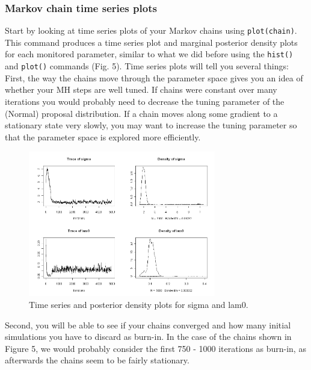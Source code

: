 \subsubsection{Markov chain time series plots}
Start by looking at time series plots of your Markov chains using \verb#plot(chain)#. This command produces a time series plot and marginal posterior density plots for each monitored parameter, similar to what we did before using the \verb#hist()# and \verb#plot()# commands (Fig. 5). Time series plots will tell you several things:
First, the way the chains move through the parameter space gives you an idea of whether your MH steps are well tuned. If chains were constant over many iterations you would probably need to decrease the tuning parameter of the (Normal) proposal distribution. If a chain moves along some gradient to a stationary state very slowly, you may want to increase the tuning parameter so that the parameter space is explored more efficiently.


\begin{figure}
\begin{center}
\includegraphics[height=2.5in]{Ch6/figs/timeseries}
\end{center}
\caption{Time series and posterior density plots for sigma and lam0.}
\label{timeseries.fig}
\end{figure}


Second, you will be able to see if your chains converged and how many initial simulations you have to discard as burn-in. In the case of the chains shown in Figure 5, we would probably consider the first 750 - 1000 iterations as burn-in, as afterwards the chains seem to be fairly stationary.

